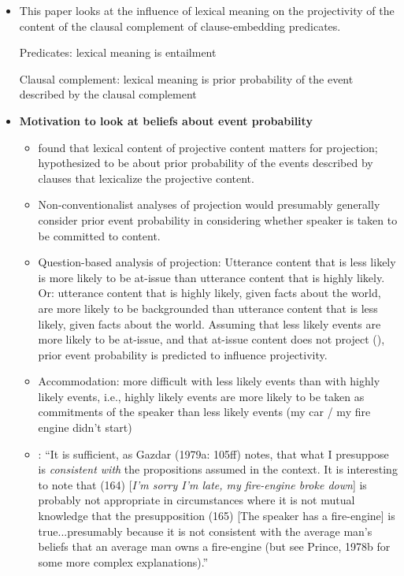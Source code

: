 \documentclass[11pt,fleqn]{article}
\newcommand{\6}{\mbox{$[\hspace*{-.6mm}[$}}
\newcommand{\9}{\mbox{$]\hspace*{-.6mm}]$}}
\begin{document}
\begin{itemize}

\item This paper looks at the influence of lexical meaning on the projectivity of the content of the clausal complement of clause-embedding predicates.

Predicates: lexical meaning is entailment

Clausal complement: lexical meaning is prior probability of the event described by the clausal complement

\item {\bf Motivation to look at beliefs about event probability}

\begin{itemize}

\item \citealt*{tbd-variability} found that lexical content of projective content matters for projection; hypothesized to be about prior probability of the events described by clauses that lexicalize the projective content.

\item Non-conventionalist analyses of projection would presumably generally consider prior event probability in considering whether speaker is taken to be committed to content.

\item Question-based analysis of projection: Utterance content that is less likely is more likely to be at-issue than utterance content that is highly likely. Or: utterance content that is highly likely, given facts about the world, are more likely to be backgrounded than utterance content that is less likely, given facts about the world. Assuming that less likely events are more likely to be at-issue, and that at-issue content does not project (\citealt{brst-salt10,tbd-variability}), prior event probability is predicted to influence projectivity.

\item Accommodation: more difficult with less likely events than with highly likely events, i.e., highly likely events are more likely to be taken as commitments of the speaker than less likely events (my car / my fire engine didn't start)

\item \citealt[205]{levinson83}: ``It is sufficient, as Gazdar (1979a: 105ff) notes, that what I presuppose is {\em consistent with} the propositions assumed in the context. It is interesting to note that (164) [{\em I'm sorry I'm late, my fire-engine broke down}] is probably not appropriate in circumstances where it is not mutual knowledge that the presupposition (165) [The speaker has a fire-engine] is true...presumably because it is not consistent with the average man's beliefs that an average man owns a fire-engine (but see Prince, 1978b for some more complex explanations).''


\end{itemize}
\end{itemize}
\end{document}
